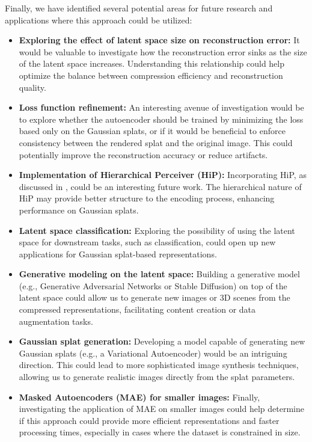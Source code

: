 Finally, we have identified several potential areas for future research and applications where this approach could be utilized:

\begin{itemize}
    \item \textbf{Exploring the effect of latent space size on reconstruction error:} It would be valuable to investigate how the reconstruction error sinks as the size of the latent space increases. Understanding this relationship could help optimize the balance between compression efficiency and reconstruction quality.
    
    \item \textbf{Loss function refinement:} An interesting avenue of investigation would be to explore whether the autoencoder should be trained by minimizing the loss based only on the Gaussian splats, or if it would be beneficial to enforce consistency between the rendered splat and the original image. This could potentially improve the reconstruction accuracy or reduce artifacts.
    
    \item \textbf{Implementation of Hierarchical Perceiver (HiP):} Incorporating HiP, as discussed in \cite{carreira2022hierarchicalp}, could be an interesting future work. The hierarchical nature of HiP may provide better structure to the encoding process, enhancing performance on Gaussian splats.
    
    \item \textbf{Latent space classification:} Exploring the possibility of using the latent space for downstream tasks, such as classification, could open up new applications for Gaussian splat-based representations.
    
    \item \textbf{Generative modeling on the latent space:} Building a generative model (e.g., Generative Adversarial Networks or Stable Diffusion) on top of the latent space could allow us to generate new images or 3D scenes from the compressed representations, facilitating content creation or data augmentation tasks.
    
    \item \textbf{Gaussian splat generation:} Developing a model capable of generating new Gaussian splats (e.g., a Variational Autoencoder) would be an intriguing direction. This could lead to more sophisticated image synthesis techniques, allowing us to generate realistic images directly from the splat parameters.
    
    \item \textbf{Masked Autoencoders (MAE) for smaller images:} Finally, investigating the application of MAE on smaller images could help determine if this approach could provide more efficient representations and faster processing times, especially in cases where the dataset is constrained in size.
\end{itemize}
